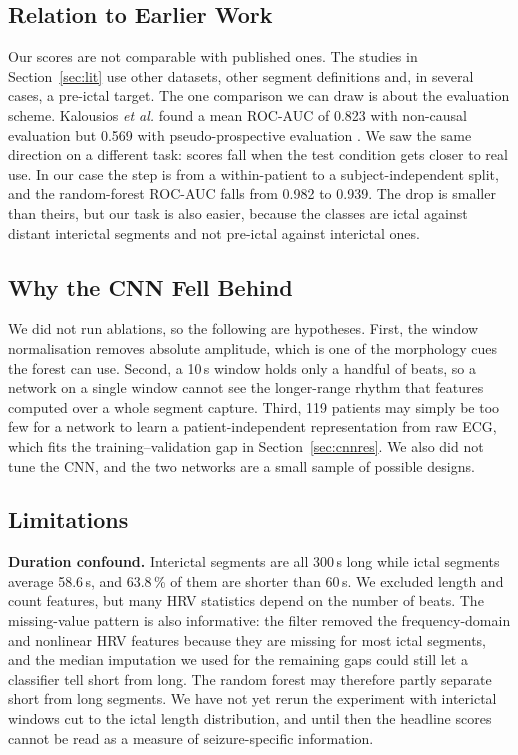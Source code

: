 \documentclass[conference,a4paper]{IEEEtran}
\begin{document}
\subsection{Relation to Earlier Work}
Our scores are not comparable with published ones. The studies in
Section~\ref{sec:lit} use other datasets, other segment definitions and, in
several cases, a pre-ictal target. The one comparison we can draw is about
the evaluation scheme. Kalousios \textit{et al.} found a mean ROC-AUC of
0.823 with non-causal evaluation but 0.569 with pseudo-prospective
evaluation \cite{Kalousios2025}. We saw the same direction on a different
task: scores fall when the test condition gets closer to real use. In our
case the step is from a within-patient to a subject-independent split, and
the random-forest ROC-AUC falls from 0.982 to 0.939. The drop is smaller
than theirs, but our task is also easier, because the classes are ictal
against distant interictal segments and not pre-ictal against interictal
ones.

\subsection{Why the CNN Fell Behind}
We did not run ablations, so the following are hypotheses. First, the window
normalisation removes absolute amplitude, which is one of the morphology
cues the forest can use. Second, a 10\,s window holds only a handful of
beats, so a network on a single window cannot see the longer-range rhythm
that features computed over a whole segment capture. Third, 119 patients may
simply be too few for a network to learn a patient-independent
representation from raw ECG, which fits the training--validation gap in
Section~\ref{sec:cnnres}. We also did not tune the CNN, and the two networks
are a small sample of possible designs.

\subsection{Limitations}
\textbf{Duration confound.} Interictal segments are all 300\,s long while
ictal segments average 58.6\,s, and 63.8\,\% of them are shorter than 60\,s.
We excluded length and count features, but many HRV statistics depend on the
number of beats. The missing-value pattern is also informative: the filter
removed the frequency-domain and nonlinear HRV features because they are
missing for most ictal segments, and the median imputation we used for the
remaining gaps could still let a classifier tell short from long. The random
forest may therefore partly separate short from long segments. We have not
yet rerun the experiment with interictal windows cut to the ictal length
distribution, and until then the headline scores cannot be read as a measure
of seizure-specific information.
\end{document}
